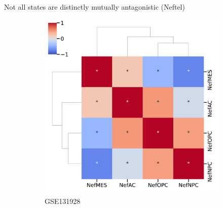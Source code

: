 \documentclass[aspectratio=169,9pt]{beamer}
\begin{document}

    \begin{frame}{Not all states are distinctly mutually antagonistic (Neftel)}
        \begin{adjustwidth}{-5cm}{-5cm}
            \centering
            \begin{figure}
                \centering
                \begin{subfigure}[c]{0.4\textwidth}
                    \centering
                    \includegraphics[width=\textwidth]{GSEA_GSM3828672_corrplot_Nef}
                    \caption{GSE131928}
                \end{subfigure}
                \begin{subfigure}[c]{0.4\textwidth}
                    \centering

\end{subfigure}
\end{figure}
\end{adjustwidth}
\end{frame}
\end{document}
